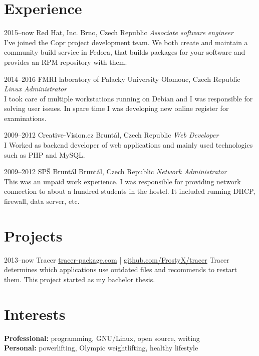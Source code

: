 \documentclass[]{friggeri-cv}
\begin{document}
\section{Experience}
\begin{entrylist}

\entry
{2015--now}
{Red Hat, Inc.}
{Brno, Czech Republic}
{\emph{Associate software engineer} \\
I've joined the Copr project development team. We both create and maintain a community build service in Fedora, that builds packages for your software and provides an RPM repository with them.}

\entry
{2014--2016}
{FMRI laboratory of Palacky University}
{Olomouc, Czech Republic}
{\emph{Linux Administrator} \\
I took care of multiple workstations running on Debian and I was responsible for solving user issues. In spare time I was developing new online register for examinations.}

\entry
{2009--2012}
{Creative-Vision.cz}
{Bruntál, Czech Republic}
{\emph{Web Developer} \\
I Worked as backend developer of web applications and mainly used technologies such as PHP and MySQL.}

\entry
{2009--2012}
{SPŠ Bruntál}
{Bruntál, Czech Republic}
{\emph{Network Administrator} \\
This was an unpaid work experience. I was responsible for providing network connection to about a hundred students in the hostel. It included running DHCP, firewall, data server, etc.}

\end{entrylist}


\section{Projects}

\begin{entrylist}

\entry
{2013--now}
{Tracer}
{\href{http://tracer-package.com}{tracer-package.com} | \href{https://github.com/FrostyX/tracer}{github.com/FrostyX/tracer}}
{Tracer determines which applications use outdated files and recommends to restart them. This project started as my bachelor thesis.}

\end{entrylist}



\section{Interests}

\textbf{Professional:} programming, GNU/Linux, open source, writing
\\
\textbf{Personal:} powerlifting, Olympic weightlifting, healthy lifestyle
\end{document}
